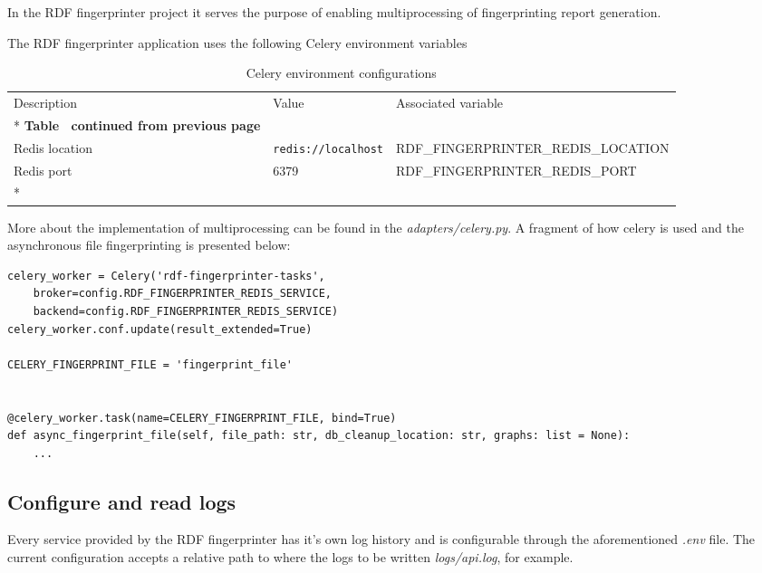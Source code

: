 In the RDF fingerprinter project it serves the purpose of enabling multiprocessing of fingerprinting report generation.

The RDF fingerprinter application uses the following Celery environment variables

\begin{longtable}[c]{@{}p{3.5cm}p{3.5cm}l@{}}
	\toprule
	Description    & Value                      & Associated variable             \\* \midrule
	\endfirsthead
	\multicolumn{3}{c}%
	{{\bfseries Table \thetable\ continued from previous page}}                   \\
	\endhead
	\bottomrule
	\endfoot
	\endlastfoot
	Redis location & \texttt{redis://localhost} & RDF\_FINGERPRINTER\_REDIS\_LOCATION \\
	Redis port     & 6379                       & RDF\_FINGERPRINTER\_REDIS\_PORT     \\*\bottomrule
	\caption{Celery environment configurations}
	\label{tab:fingerprinter-celery-env}                                              \\
\end{longtable}

More about the implementation of multiprocessing can be found in the \textit{adapters/celery.py}. A fragment of how celery is used and the asynchronous file fingerprinting is presented below:

\begin{lstlisting}
celery_worker = Celery('rdf-fingerprinter-tasks',
	broker=config.RDF_FINGERPRINTER_REDIS_SERVICE,
	backend=config.RDF_FINGERPRINTER_REDIS_SERVICE)
celery_worker.conf.update(result_extended=True)

CELERY_FINGERPRINT_FILE = 'fingerprint_file'


@celery_worker.task(name=CELERY_FINGERPRINT_FILE, bind=True)
def async_fingerprint_file(self, file_path: str, db_cleanup_location: str, graphs: list = None):
	...
\end{lstlisting}

\subsection{Configure and read logs}
Every service provided by the RDF fingerprinter has it's own log history and is configurable through the aforementioned \textit{.env} file. The current configuration accepts a relative path to where the logs to be written \textit{logs/api.log}, for example.

